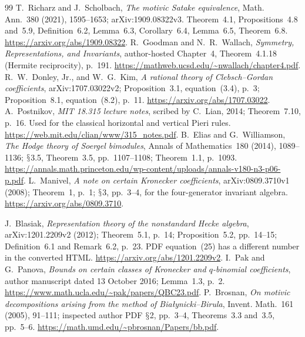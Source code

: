 \documentclass[11pt,a4paper]{article}
\renewcommand{\S}{\ensuremath{\mathsection}}
\theoremstyle{named}\newtheorem{finding}{Finding}[section]
\theoremstyle{definition}\newtheorem{definition}[finding]{Definition}
\theoremstyle{remark}\newtheorem{remark}[finding]{Remark}
\begin{document}
\begin{thebibliography}{99}
 T.~Richarz and J.~Scholbach, \emph{The motivic Satake equivalence}, Math. Ann.~380 (2021), 1595--1653; arXiv:1909.08322v3. Theorem~4.1, Propositions~4.8 and~5.9, Definition~6.2, Lemma~6.3, Corollary~6.4, Lemma~6.5, Theorem~6.8. \url{https://arxiv.org/abs/1909.08322}.
 R.~Goodman and N.~R.~Wallach, \emph{Symmetry, Representations, and Invariants}, author-hosted Chapter~4, Theorem~4.1.18 (Hermite reciprocity), p.~191. \url{https://mathweb.ucsd.edu/~nwallach/chapter4.pdf}.
 R.~W.~Donley, Jr., and W.~G.~Kim, \emph{A rational theory of Clebsch--Gordan coefficients}, arXiv:1707.03022v2; Proposition~3.1, equation~(3.4), p.~3; Proposition~8.1, equation~(8.2), p.~11. \url{https://arxiv.org/abs/1707.03022}.
 A.~Postnikov, \emph{MIT 18.315 lecture notes}, scribed by C.~Lian, 2014; Theorem~7.10, p.~16. Used for the classical horizontal and vertical Pieri rules. \url{https://web.mit.edu/clian/www/315_notes.pdf}.
 B.~Elias and G.~Williamson, \emph{The Hodge theory of Soergel bimodules}, Annals of Mathematics~180 (2014), 1089--1136; \S3.5, Theorem~3.5, pp.~1107--1108; Theorem~1.1, p.~1093. \url{https://annals.math.princeton.edu/wp-content/uploads/annals-v180-n3-p06-p.pdf}.
 L.~Manivel, \emph{A note on certain Kronecker coefficients}, arXiv:0809.3710v1 (2008); Theorem~1, p.~1; \S3, pp.~3--4, for the four-generator invariant algebra. \url{https://arxiv.org/abs/0809.3710}.

 J.~Blasiak, \emph{Representation theory of the nonstandard Hecke algebra}, arXiv:1201.2209v2 (2012); Theorem~5.1, p.~14; Proposition~5.2, pp.~14--15; Definition~6.1 and Remark~6.2, p.~23. PDF equation~(25) has a different number in the converted HTML. \url{https://arxiv.org/abs/1201.2209v2}.
 I.~Pak and G.~Panova, \emph{Bounds on certain classes of Kronecker and $q$-binomial coefficients}, author manuscript dated 13 October 2016; Lemma~1.3, p.~2. \url{https://www.math.ucla.edu/~pak/papers/QBC23.pdf}.
 P.~Brosnan, \emph{On motivic decompositions arising from the method of Bia\l ynicki--Birula}, Invent. Math.~161 (2005), 91--111; inspected author PDF \S2, pp.~3--4, Theorems~3.3 and~3.5, pp.~5--6. \url{https://math.umd.edu/~pbrosnan/Papers/bb.pdf}.



\end{thebibliography}
\end{document}
